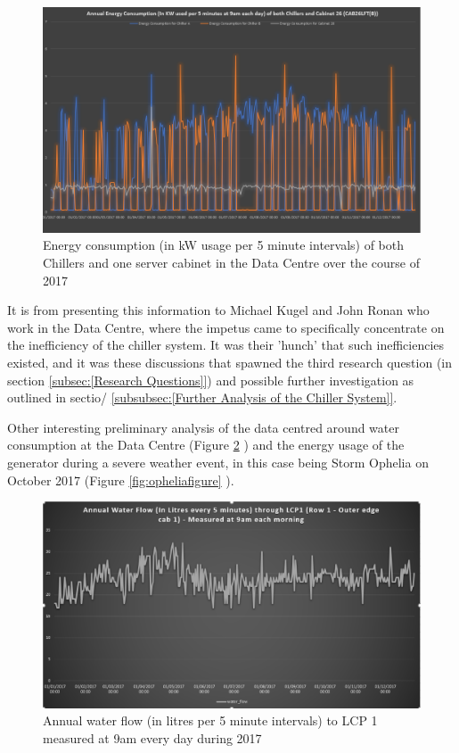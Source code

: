 \documentclass[12pt]{scrartcl}
\begin{document}
\begin{figure}[h]
  \caption{Energy consumption (in kW usage per 5 minute intervals) of both Chillers and one server cabinet in the Data Centre over the course of 2017}
  \label{fig:cabvchillerfigure}
  \centering
    \includegraphics[scale=0.45]{Energy_consumption_of_cab26_and_chillers}
\end{figure} 

It is from presenting this information to Michael Kugel and John Ronan who work in the Data Centre, where the impetus came to specifically concentrate on the inefficiency of the chiller system. It was their 'hunch' that such inefficiencies existed, and it was these discussions that spawned the third research question (in section \ref{subsec:[Research Questions]}) and possible further investigation as outlined in sectio/ \ref{subsubsec:[Further Analysis of the Chiller System]}.   

Other interesting preliminary analysis of the data centred around water consumption at the Data Centre (Figure \ref{fig:annualwaterfigure} ) and the energy usage of the generator during a severe weather event, in this case being Storm Ophelia on October 2017 (Figure \ref{fig:opheliafigure} ). 

\begin{figure}[h]
  \caption{Annual water flow (in litres per 5 minute intervals) to LCP 1 measured at 9am every day during 2017}
  \label{fig:annualwaterfigure}
  \centering
    \includegraphics[scale=0.45]{Annual_Water_Flow}
\end{figure} 
\end{document}
